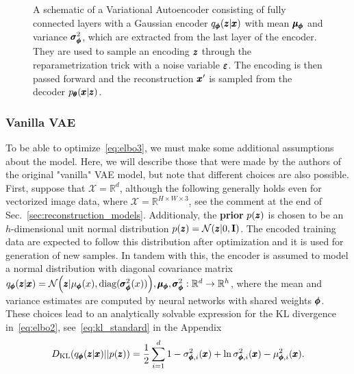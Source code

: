 \begin{figure}
\centering{}
\caption{A schematic of a Variational Autoencoder consisting of fully connected layers with a Gaussian encoder $q_{\pmb{{\phi}}}(\pmb{{z}}|\pmb{{x}})$ with mean $\pmb{{\mu}}_{\pmb{{\phi}}}$ and variance $\pmb{{\sigma}}^2_{\pmb{{\phi}}}$, which are extracted from the last layer of the encoder. They are used to sample an encoding $\pmb{{z}}$ through the reparametrization trick with a noise variable $\pmb{{\varepsilon}}$. The encoding is then passed forward and the reconstruction $\pmb{{x}}'$ is sampled from the decoder $p_{\pmb{{\theta}}}(\pmb{{x}}|\pmb{{z}})$.}
\label{fig:vae}
\end{figure}

\subsubsection{Vanilla VAE}
To be able to optimize~\eqref{eq:elbo3}, we must make some additional assumptions about the model. Here, we will describe those that were made by the authors of the original "vanilla" VAE model, but note that different choices are also possible. First, suppose that $\mathcal{X} = \mathbb{R}^d$, although the following generally holds even for vectorized image data, where $\mathcal{X} = \mathbb{R}^{H \times W\times3}$, see the comment at the end of Sec.~\ref{sec:reconstruction_models}. Additionaly, the \textbf{prior} $p(\pmb{{z}})$ is chosen to be an $h$-dimensional unit normal distribution $p(\pmb{{z}})=\mathcal{N}(\pmb{{z}}|0,\textbf{I})$. The encoded training data are expected to follow this distribution after optimization and it is used for generation of new samples. In tandem with this, the encoder is assumed to model a normal distribution with diagonal covariance matrix $q_{\vc{\phi}}(\vc{z}|\vc{x})=\mathcal{N}\left(\vc{z}|\mu_{\vc{\phi}}(x), \text{diag}(\vc{\sigma}^2_{\vc{\phi}}(x))\right), \vc{\mu}_{\vc{\phi}}, \vc{\sigma}^2_{\vc{\phi}}:\mathbb{R}^d \rightarrow \mathbb{R}^h$, where the mean and variance estimates are computed by neural networks with shared weights $\pmb{{\phi}}$. These choices lead to an analytically solvable expression for the KL divergence in~\eqref{eq:elbo2}, see~\eqref{eq:kl_standard} in the Appendix
\begin{equation} \label{eq:vae_kld}
D_{\text{KL}}\left(q_{\vc{\phi}}(\vc{z}|\vc{x})||p(\vc{z}) \right) = \frac{1}{2}\sum_{i=1}^{d} 1-\sigma_{\vc{\phi},i}^{2}(\vc{x})+\ln \sigma_{\vc{\phi},i}^{2}(\vc{x}) -\mu_{\vc{\phi},i}^{2}(\vc{x}).
\end{equation}


